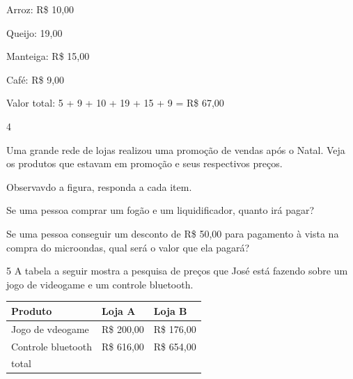 \begin{escolha}
{Arroz: R\$ 10,00

Queijo: 19,00

Manteiga: R\$ 15,00

Café: R\$ 9,00

Valor total: 5 + 9 + 10 + 19 + 15 + 9 = R\$ 67,00

\num{4}

Uma grande rede de lojas realizou uma promoção de vendas após o Natal.
Veja os produtos que estavam em promoção e seus respectivos preços.






Observavdo a figura, responda a cada item.

\begin{escolha}

\item
  Se uma pessoa comprar um fogão e um liquidificador, quanto irá pagar?

\item
  Se uma pessoa conseguir um desconto de R\$ 50,00 para pagamento à
  vista na compra do microondas, qual será o valor que ela pagará?

\end{escolha}

\num{5} A tabela a seguir mostra a pesquisa de preços que José está fazendo
sobre um jogo de videogame e um controle bluetooth.

\begin{longtable}[]{@{}lll@{}}
\toprule
Produto & Loja A & Loja B\tabularnewline
\midrule
\endhead
Jogo de vdeogame & R\$ 200,00 & R\$ 176,00\tabularnewline
Controle bluetooth & R\$ 616,00 & R\$ 654,00\tabularnewline
total & &\tabularnewline
\bottomrule
\end{longtable}

}
\end{escolha}
